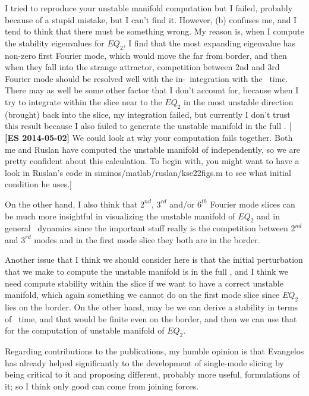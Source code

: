 \begin{description}
I tried to reproduce your unstable manifold computation but I failed, probably
because of a stupid mistake, but I can't find it. However,  (b)
confuses me, and I tend to think that there must be something wrong. My
reason is, when I compute the stability eigenvalues for $EQ_2$, I find that
the most expanding eigenvalue has non-zero first Fourier mode, which would
move the far from border, and then when they fall into the strange attractor,
competition between 2nd and 3rd Fourier mode should be resolved well with
the in-\slice\ integration with the \slice\ time. There may as well be
some other factor that I don't account for, because when I try to integrate
within the slice near to the $EQ_2$ in the most unstable direction (brought)
back into the slice, my integration failed, but currently I don't trust this
result because I also failed to generate the unstable manifold in the full
\statesp .
[ {\bf [ES 2014-05-02]} We could look at why your computation fails together.
Both me and Ruslan have computed the unstable manifold of  independently,
so we are pretty confident about this calculation. To begin with, you might want
to have a look in Ruslan's code in siminos/matlab/ruslan/kse22figs.m to see
what initial condition he uses.]


On the other hand, I also think that $2^{nd}$, $3^{rd}$ and/or $6^{th}$ Fourier
mode slices can be much more insightful in visualizing the unstable manifold
of $EQ_2$ and in general \KS\ dynamics since the important stuff really
is the competition between $2^{nd}$ and $3^{rd}$ modes and in the first mode
slice they both are in the border.

Another issue that I think we should consider here is that the initial perturbation
that we make to compute the unstable manifold is in the full \statesp ,
and I think we need compute stability within the slice if we want to have
a correct unstable manifold, which again something we cannot do on the first
mode slice since $EQ_2$ lies on the border. On the other hand, may be we
can derive a stability in terms of \slice\ time, and that would be finite
even on the border, and then we can use that for the computation of unstable
manifold of $EQ_2$.

Regarding contributions to the publications, my humble opinion is that Evangelos
has already helped significantly to the development of single-mode slicing
by being critical to it and proposing different, probably more useful, formulations
of it; so I think only good can come from joining forces.


\end{description}
